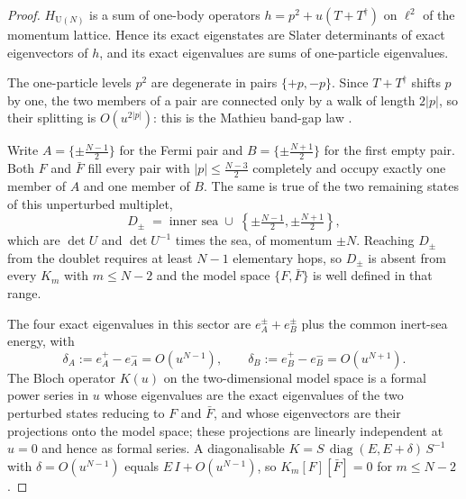 \documentclass[11pt,a4paper]{article}
\theoremstyle{definition}
\DeclareMathOperator{\diag}{diag}
\newcommand{\dg}{^{\dagger}}
\newcommand{\U}{\mathrm{U}}
\begin{document}
\begin{proof}
$H_{\U(N)}$ is a sum of one-body operators $h = p^2 + u(T + T\dg)$ on $\ell^2$ of the momentum lattice. Hence its exact eigenstates are Slater determinants of exact eigenvectors of $h$, and its exact eigenvalues are sums of one-particle eigenvalues.

The one-particle levels $p^2$ are degenerate in pairs $\{+p,-p\}$. Since $T + T\dg$ shifts $p$ by one, the two members of a pair are connected only by a walk of length $2|p|$, so their splitting is $O(u^{2|p|})$: this is the Mathieu band-gap law \cite{McLachlan1947,AbramowitzStegun1964}.

Write $A = \{\pm\tfrac{N-1}{2}\}$ for the Fermi pair and $B = \{\pm\tfrac{N+1}{2}\}$ for the first empty pair. Both $F$ and $\bar F$ fill every pair with $|p|\le\tfrac{N-3}{2}$ completely and occupy exactly one member of $A$ and one member of $B$. The same is true of the two remaining states of this unperturbed multiplet,
\begin{equation*}
  D_\pm \;=\; \text{inner sea} \;\cup\; \left\{\pm\tfrac{N-1}{2}, \pm\tfrac{N+1}{2}\right\},
\end{equation*}
which are $\det U$ and $\det U^{-1}$ times the sea, of momentum $\pm N$. Reaching $D_\pm$ from the doublet requires at least $N-1$ elementary hops, so $D_\pm$ is absent from every $K_m$ with $m\le N-2$ and the model space $\{F,\bar F\}$ is well defined in that range.

The four exact eigenvalues in this sector are $e_A^{\pm} + e_B^{\pm}$ plus the common inert-sea energy, with
\begin{equation}\label{eq:mathieu_gaps}
  \delta_A := e_A^+ - e_A^- = O(u^{N-1}), \qquad \delta_B := e_B^+ - e_B^- = O(u^{N+1}).
\end{equation}
The Bloch operator $K(u)$ on the two-dimensional model space is a formal power series in $u$ whose eigenvalues are the exact eigenvalues of the two perturbed states reducing to $F$ and $\bar F$, and whose eigenvectors are their projections onto the model space; these projections are linearly independent at $u=0$ and hence as formal series. A diagonalisable $K = S\,\diag(E, E+\delta)\,S^{-1}$ with $\delta = O(u^{N-1})$ equals $E\,I + O(u^{N-1})$, so $K_m[F][\bar F] = 0$ for $m \le N-2$.
\end{proof}
\end{document}
